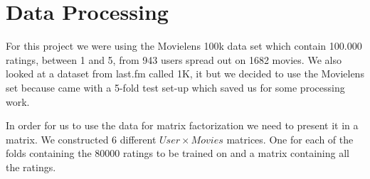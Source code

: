 \section{Data Processing}\label{sec:data_preprocessing}
For this project we were using the Movielens 100k data set which contain 100.000 ratings, between 1 and 5, from 943 users spread out on 1682 movies\cite{movielens100k}. 
We also looked at a dataset from last.fm called 1K\cite{lastfmdataset}, it but we decided to use the Movielens set because came with a 5-fold test set-up which saved us for some processing work.

In order for us to use the data for matrix factorization we need to present it in a matrix. We constructed 6 different $User \times Movies$ matrices. One for each of the folds containing the 80000 ratings to be trained on and a matrix containing all the ratings.


